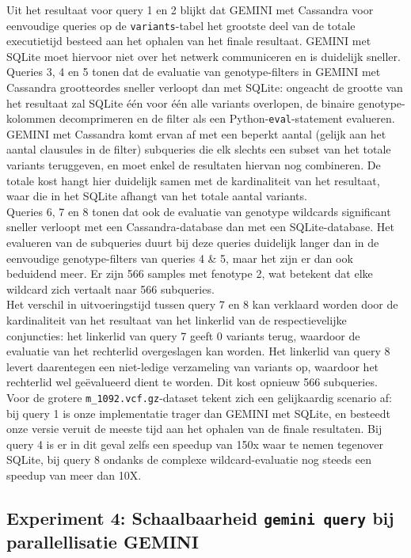 Uit het resultaat voor query 1 en 2 blijkt dat GEMINI met Cassandra voor eenvoudige queries op de \texttt{variants}-tabel het grootste deel van de totale executietijd besteed aan het ophalen van het finale resultaat. GEMINI met SQLite moet hiervoor niet over het netwerk communiceren en is duidelijk sneller.\\
Queries 3, 4 en 5 tonen dat de evaluatie van genotype-filters in GEMINI met Cassandra grootteordes sneller verloopt dan met SQLite: ongeacht de grootte van het resultaat zal SQLite \'e\'en voor \'e\'en alle variants overlopen, de binaire genotype-kolommen decomprimeren en de filter als een Python-\texttt{eval}-statement evalueren. GEMINI met Cassandra komt ervan af met een beperkt aantal (gelijk aan het aantal clausules in de filter) subqueries die elk slechts een subset van het totale variants teruggeven, en moet enkel de resultaten hiervan nog combineren. De totale kost hangt hier duidelijk samen met de kardinaliteit van het resultaat, waar die in het SQLite afhangt van het totale aantal variants.\\
Queries 6, 7 en 8 tonen dat ook de evaluatie van genotype wildcards significant sneller verloopt met een Cassandra-database dan met een SQLite-database. Het evalueren van de subqueries duurt bij deze queries duidelijk langer dan in de eenvoudige genotype-filters van queries 4 \& 5, maar het zijn er dan ook beduidend meer. Er zijn 566 samples met fenotype 2, wat betekent dat elke wildcard zich vertaalt naar 566 subqueries. \\
Het verschil in uitvoeringstijd tussen query 7 en 8 kan verklaard worden door de kardinaliteit van het resultaat van het linkerlid van de respectievelijke conjuncties: het linkerlid van query 7 geeft 0 variants terug, waardoor de evaluatie van het rechterlid overgeslagen kan worden. Het linkerlid van query 8 levert daarentegen een niet-ledige verzameling van variants op, waardoor het rechterlid wel ge\"evalueerd dient te worden. Dit kost opnieuw 566 subqueries.\\

Voor de grotere \texttt{m\_1092.vcf.gz}-dataset tekent zich een gelijkaardig scenario af: bij query 1 is onze implementatie trager dan GEMINI met SQLite, en besteedt onze versie veruit de meeste tijd aan het ophalen van de finale resultaten. Bij query 4 is er in dit geval zelfs een speedup van 150x waar te nemen tegenover SQLite, bij query 8 ondanks de complexe wildcard-evaluatie nog steeds een speedup van meer dan 10X. 

\subsection{Experiment 4: Schaalbaarheid \texttt{gemini query} bij parallellisatie GEMINI}
\label{exp4}

